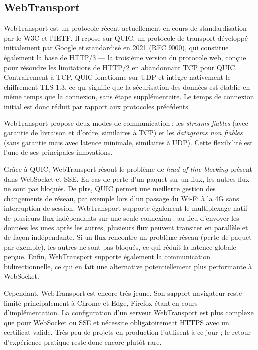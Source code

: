 \subsection{WebTransport}

WebTransport est un protocole récent actuellement en cours de standardisation par le W3C et l'IETF. Il repose sur QUIC, un protocole de transport développé initialement par Google et standardisé en 2021 (RFC 9000), qui constitue également la base de HTTP/3 --- la troisième version du protocole web, conçue pour résoudre les limitations de HTTP/2 en abandonnant TCP pour QUIC. Contrairement à TCP, QUIC fonctionne sur UDP et intègre nativement le chiffrement TLS 1.3, ce qui signifie que la sécurisation des données est établie en même temps que la connexion, sans étape supplémentaire. Le temps de connexion initial est donc réduit par rapport aux protocoles précédents.

WebTransport propose deux modes de communication : les \textit{streams fiables} (avec garantie de livraison et d'ordre, similaires à TCP) et les \textit{datagrams non fiables} (sans garantie mais avec latence minimale, similaires à UDP). Cette flexibilité est l'une de ses principales innovations.

Grâce à QUIC, WebTransport résout le problème de \textit{head-of-line blocking} présent dans WebSocket et SSE. En cas de perte d'un paquet sur un flux, les autres flux ne sont pas bloqués. De plus, QUIC permet une meilleure gestion des changements de réseau, par exemple lors d'un passage du Wi-Fi à la 4G sans interruption de session. WebTransport supporte également le multiplexage natif de plusieurs flux indépendants sur une seule connexion : au lieu d'envoyer les données les unes après les autres, plusieurs flux peuvent transiter en parallèle et de façon indépendante. Si un flux rencontre un problème réseau (perte de paquet par exemple), les autres ne sont pas bloqués, ce qui réduit la latence globale perçue. Enfin, WebTransport supporte également la communication bidirectionnelle, ce qui en fait une alternative potentiellement plus performante à WebSocket.

Cependant, WebTransport est encore très jeune. Son support navigateur reste limité principalement à Chrome et Edge, Firefox étant en cours d'implémentation. La configuration d'un serveur WebTransport est plus complexe que pour WebSocket ou SSE et nécessite obligatoirement HTTPS avec un certificat valide. Très peu de projets en production l'utilisent à ce jour ; le retour d'expérience pratique reste donc encore plutôt rare.

